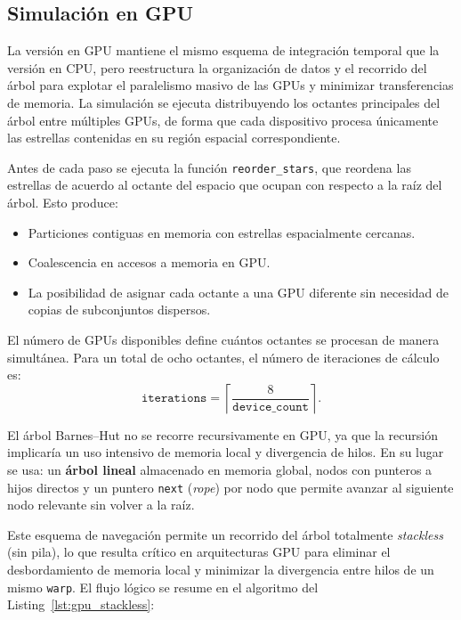 \subsection{Simulación en GPU}\label{subsec:simulacion-gpu}

La versión en GPU mantiene el mismo esquema de integración temporal que la versión en CPU, pero reestructura la organización de datos y el recorrido del árbol para explotar el paralelismo masivo de las GPUs y minimizar transferencias de memoria.
La simulación se ejecuta distribuyendo los octantes principales del árbol entre múltiples GPUs, de forma que cada dispositivo procesa únicamente las estrellas contenidas en su región espacial correspondiente.

Antes de cada paso se ejecuta la función \texttt{reorder\_stars}, que reordena las estrellas de acuerdo al octante del espacio que ocupan con respecto a la raíz del árbol.
Esto produce:
\begin{itemize}
    \item Particiones contiguas en memoria con estrellas espacialmente cercanas.
    \item Coalescencia en accesos a memoria en GPU.
    \item La posibilidad de asignar cada octante a una GPU diferente sin necesidad de copias de subconjuntos dispersos.
\end{itemize}

El número de GPUs disponibles define cuántos octantes se procesan de manera simultánea.
Para un total de ocho octantes, el número de iteraciones de cálculo es:
\[
    \texttt{iterations} = \left\lceil \frac{8}{\texttt{device\_count}} \right\rceil.
\]

El árbol Barnes--Hut no se recorre recursivamente en GPU, ya que la recursión implicaría un uso intensivo de memoria local y divergencia de hilos.
En su lugar se usa: un \textbf{árbol lineal} almacenado en memoria global, nodos con punteros a hijos directos y un puntero \texttt{next} (\emph{rope}) por nodo que permite avanzar al siguiente nodo relevante sin volver a la raíz.

Este esquema de navegación permite un recorrido del árbol totalmente \emph{stackless} (sin pila), lo que resulta crítico en arquitecturas GPU para eliminar el desbordamiento de memoria local y minimizar la divergencia entre hilos de un mismo \texttt{warp}.
El flujo lógico se resume en el algoritmo del Listing~\ref{lst:gpu_stackless}:

